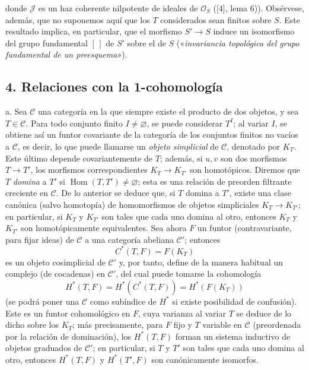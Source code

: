 \documentclass[11pt,twoside,openany]{book}
\numberwithin{equation}{section}
\newcommand{\src}[1]{%
  \phantomsection\hypertarget{src:#1}{}%
  \marginpar{\raggedleft\footnotesize\sffamily #1}%
}
\theoremstyle{plain}
\theoremstyle{definition}
\theoremstyle{remark}
\newcommand{\FgaUnitKey}{frontmatter}
\renewcommand{\src}[1]{%
  \phantomsection\hypertarget{src:\FgaUnitKey:#1}{}%
  \marginpar{\raggedleft\footnotesize\sffamily #1}%
}
\theoremstyle{plain}
\theoremstyle{definition}
\theoremstyle{remark}
\begin{document}
\src{310}
donde $\mathcal J$ es un haz coherente nilpotente de ideales de $\mathcal O_S$
([4], lema 6)). Obsérvese, además, que no suponemos aquí que los $T$
considerados sean finitos sobre $S$. Este resultado implica, en particular,
que el morfismo $S'\longrightarrow S$ induce un isomorfismo del grupo
fundamental $[\,]$ de $S'$ sobre el de $S$ («\emph{invariancia topológica del
grupo fundamental de un preesquema}»).

\subsection*{4. Relaciones con la 1-cohomología}

\medskip\noindent
a. Sea $\mathcal C$ una categoría en la que siempre existe el producto de dos
objetos, y sea $T\in\mathcal C$. Para todo conjunto finito
$I\ne\varnothing$, se puede considerar $T^I$; al variar $I$, se obtiene así un
funtor covariante de la categoría de los conjuntos finitos no vacíos a
$\mathcal C$, es decir, lo que puede llamarse un \emph{objeto simplicial} de
$\mathcal C$, denotado por $K_T$. Este último depende covariantemente de $T$;
además, si $u,v$ son dos morfismos $T\longrightarrow T'$, los morfismos
correspondientes $K_T\longrightarrow K_{T'}$ son homotópicos. Diremos que $T$
\emph{domina} a $T'$ si $\operatorname{Hom}(T,T')\ne\varnothing$; esta es una
relación de preorden filtrante creciente en $\mathcal C$. De lo anterior se
deduce que, si $T$ domina a $T'$, existe una clase canónica (salvo homotopía)
de homomorfismos de objetos simpliciales $K_T\longrightarrow K_{T'}$; en
particular, si $K_T$ y $K_{T'}$ son tales que cada uno domina al otro, entonces
$K_T$ y $K_{T'}$ son homotópicamente equivalentes. Sea ahora $F$ un funtor
(contravariante, para fijar ideas) de $\mathcal C$ a una categoría abeliana
$\mathcal C'$; entonces
\[
  C^*(T,F)=F(K_T)
\]
es un objeto cosimplicial de $\mathcal C'$ y, por tanto, define de la manera
habitual un complejo (de cocadenas) en $\mathcal C'$, del cual puede tomarse la
cohomología
\[
  H^*(T,F)=H^*(C^*(T,F))=H^*(F(K_T))
\]
(se podrá poner una $\mathcal C$ como subíndice de $H^*$ si existe posibilidad
de confusión). Este es un funtor cohomológico en $F$, cuya varianza al variar
$T$ se deduce de lo dicho sobre los $K_T$; más precisamente, para $F$ fijo y
$T$ variable en $\mathcal C$ (preordenada por la relación de dominación), los
$H^*(T,F)$ forman un sistema inductivo de objetos graduados de $\mathcal C'$;
en particular, si $T$ y $T'$ son tales que cada uno domina al otro, entonces
$H^*(T,F)$ y $H^*(T',F)$ son canónicamente isomorfos.
\end{document}
